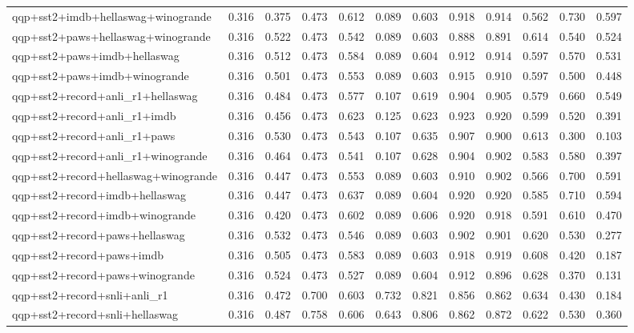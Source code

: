 \begin{table}[t]
\begin{tabular}{lrrrrrrrrrrr}
    qqp+sst2+imdb+hellaswag+winogrande & 0.316 & 0.375 & 0.473 & 0.612 & 0.089 & 0.603 & 0.918 & 0.914 & 0.562 & 0.730 & 0.597 \\
    qqp+sst2+paws+hellaswag+winogrande & 0.316 & 0.522 & 0.473 & 0.542 & 0.089 & 0.603 & 0.888 & 0.891 & 0.614 & 0.540 & 0.524 \\
    qqp+sst2+paws+imdb+hellaswag & 0.316 & 0.512 & 0.473 & 0.584 & 0.089 & 0.604 & 0.912 & 0.914 & 0.597 & 0.570 & 0.531 \\
    qqp+sst2+paws+imdb+winogrande & 0.316 & 0.501 & 0.473 & 0.553 & 0.089 & 0.603 & 0.915 & 0.910 & 0.597 & 0.500 & 0.448 \\
    qqp+sst2+record+anli\_r1+hellaswag & 0.316 & 0.484 & 0.473 & 0.577 & 0.107 & 0.619 & 0.904 & 0.905 & 0.579 & 0.660 & 0.549 \\
    qqp+sst2+record+anli\_r1+imdb & 0.316 & 0.456 & 0.473 & 0.623 & 0.125 & 0.623 & 0.923 & 0.920 & 0.599 & 0.520 & 0.391 \\
    qqp+sst2+record+anli\_r1+paws & 0.316 & 0.530 & 0.473 & 0.543 & 0.107 & 0.635 & 0.907 & 0.900 & 0.613 & 0.300 & 0.103 \\
    qqp+sst2+record+anli\_r1+winogrande & 0.316 & 0.464 & 0.473 & 0.541 & 0.107 & 0.628 & 0.904 & 0.902 & 0.583 & 0.580 & 0.397 \\
    qqp+sst2+record+hellaswag+winogrande & 0.316 & 0.447 & 0.473 & 0.553 & 0.089 & 0.603 & 0.910 & 0.902 & 0.566 & 0.700 & 0.591 \\
    qqp+sst2+record+imdb+hellaswag & 0.316 & 0.447 & 0.473 & 0.637 & 0.089 & 0.604 & 0.920 & 0.920 & 0.585 & 0.710 & 0.594 \\
    qqp+sst2+record+imdb+winogrande & 0.316 & 0.420 & 0.473 & 0.602 & 0.089 & 0.606 & 0.920 & 0.918 & 0.591 & 0.610 & 0.470 \\
    qqp+sst2+record+paws+hellaswag & 0.316 & 0.532 & 0.473 & 0.546 & 0.089 & 0.603 & 0.902 & 0.901 & 0.620 & 0.530 & 0.277 \\
    qqp+sst2+record+paws+imdb & 0.316 & 0.505 & 0.473 & 0.583 & 0.089 & 0.603 & 0.918 & 0.919 & 0.608 & 0.420 & 0.187 \\
    qqp+sst2+record+paws+winogrande & 0.316 & 0.524 & 0.473 & 0.527 & 0.089 & 0.604 & 0.912 & 0.896 & 0.628 & 0.370 & 0.131 \\
    qqp+sst2+record+snli+anli\_r1 & 0.316 & 0.472 & 0.700 & 0.603 & 0.732 & 0.821 & 0.856 & 0.862 & 0.634 & 0.430 & 0.184 \\
    qqp+sst2+record+snli+hellaswag & 0.316 & 0.487 & 0.758 & 0.606 & 0.643 & 0.806 & 0.862 & 0.872 & 0.622 & 0.530 & 0.360 \\

\end{tabular}
\end{table}
